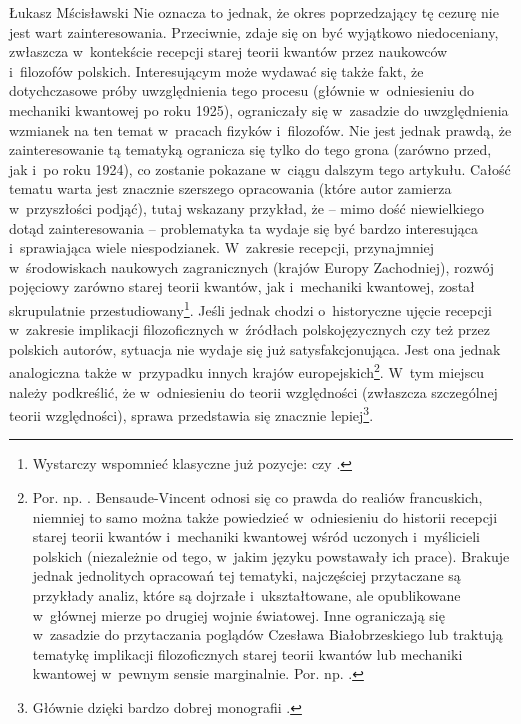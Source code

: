 \begin{artplenv}{Łukasz Mścisławski}
Nie oznacza to jednak, że okres poprzedzający tę cezurę nie jest wart zainteresowania. Przeciwnie, zdaje się on być wyjątkowo niedoceniany, zwłaszcza w~kontekście recepcji starej teorii kwantów przez naukowców i~filozofów polskich. Interesującym może wydawać się także fakt, że dotychczasowe próby uwzględnienia tego procesu (głównie w~odniesieniu do mechaniki kwantowej po roku 1925), ograniczały się w~zasadzie do uwzględnienia wzmianek na ten temat w~pracach fizyków i~filozofów. Nie jest jednak prawdą, że zainteresowanie tą tematyką ogranicza się tylko do tego grona (zarówno przed, jak i~po roku 1924), co zostanie pokazane w~ciągu dalszym tego artykułu. Całość tematu warta jest znacznie szerszego opracowania (które autor zamierza w~przyszłości podjąć), tutaj wskazany przykład, że -- mimo dość niewielkiego dotąd zainteresowania -- problematyka ta wydaje się być bardzo interesująca i~sprawiająca wiele niespodzianek. W~zakresie recepcji, przynajmniej w~środowiskach naukowych zagranicznych (krajów Europy Zachodniej), rozwój pojęciowy zarówno starej teorii kwantów, jak i~mechaniki kwantowej, został skrupulatnie przestudiowany\footnote{Wystarczy wspomnieć klasyczne już pozycje:
\parencite[][]{jammer_conceptual_1966} %
 czy 
\parencite[][]{kragh_quantum_1999}.%
}. Jeśli jednak chodzi o~historyczne ujęcie recepcji w~zakresie implikacji filozoficznych w~źródłach polskojęzycznych czy też przez polskich autorów, sytuacja nie wydaje się już satysfakcjonująca. Jest ona jednak analogiczna także w~przypadku innych krajów
europejskich\footnote{Por. np. 
\parencite[][]{bensaude-vincent_when_1988}. %
 Bensaude-Vincent odnosi się co prawda do realiów francuskich, niemniej to samo można także powiedzieć w~odniesieniu do historii recepcji starej teorii kwantów i~mechaniki kwantowej wśród uczonych i~myślicieli polskich (niezależnie od tego, w~jakim języku powstawały ich prace). Brakuje jednak jednolitych opracowań tej tematyki, najczęściej przytaczane są przykłady analiz, które są dojrzałe i~ukształtowane, ale opublikowane w~głównej mierze po drugiej wojnie światowej. Inne ograniczają się w~zasadzie do przytaczania poglądów Czesława Białobrzeskiego lub traktują tematykę implikacji filozoficznych starej teorii kwantów lub mechaniki kwantowej w~pewnym sensie marginalnie. Por. np. 
\parencites[][]{dabrowski_o_1980}[][]{kostro_philosophie_1969}[][]{heller_krakowska_2007}[][]{heller_krakowska_2007-1}[czy][]{mscislawski_miedzy_2017}.}.
% 
% 
W~tym miejscu należy podkreślić, że w~odniesieniu do teorii względności (zwłaszcza szczególnej teorii względności), sprawa przedstawia się znacznie lepiej\footnote{Głównie dzięki bardzo dobrej monografii 
\parencite[][]{polak_bylem_2012}.%
}.


\end{artplenv}
